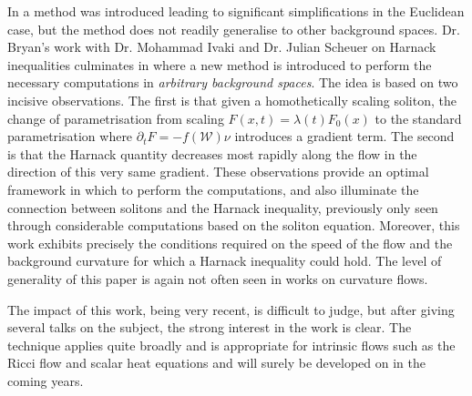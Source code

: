 \documentclass[12pt]{amsart}
\begin{document}
In \cite{MR1296393} a method was introduced leading to significant simplifications in the Euclidean case, but the method does not readily generalise to other background spaces. Dr. Bryan's work with Dr. Mohammad Ivaki and Dr. Julian Scheuer on Harnack inequalities culminates in \cite{BIS4} where a new method is introduced to perform the necessary computations in \emph{arbitrary background spaces}. The idea is based on two incisive observations. The first is that given a homothetically scaling soliton, the change of parametrisation from scaling $F(x, t) = \lambda(t) F_0(x)$ to the standard parametrisation where $\partial_t F = -f(\mathcal{W})\nu$ introduces a gradient term. The second is that the Harnack quantity decreases most rapidly along the flow in the direction of this very same gradient. These observations provide an optimal framework in which to perform the computations, and also illuminate the connection between solitons and the Harnack inequality, previously only seen through considerable computations based on the soliton equation. Moreover, this work exhibits precisely the conditions required on the speed of the flow and the background curvature for which a Harnack inequality could hold. The level of generality of this paper is again not often seen in works on curvature flows.

The impact of this work, being very recent, is difficult to judge, but after giving several talks on the subject, the strong interest in the work is clear. The technique applies quite broadly and is appropriate for intrinsic flows such as the Ricci flow and scalar heat equations and will surely be developed on in the coming years.
\end{document}
